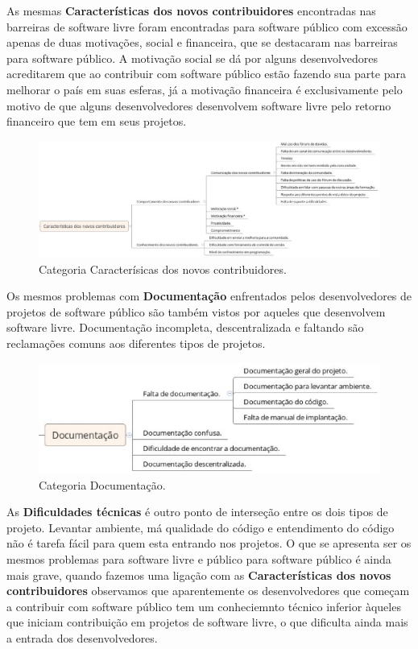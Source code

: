 As mesmas \textbf{Características dos novos contribuidores} encontradas nas barreiras
de software livre foram encontradas para software público com excessão apenas de duas
motivações, social e financeira, que se destacaram nas barreiras para software público.
A motivação social se dá por alguns desenvolvedores acreditarem que ao contribuir com 
software público estão fazendo sua parte para melhorar o país em suas esferas, já
a motivação financeira é exclusivamente pelo motivo de que alguns desenvolvedores
desenvolvem software livre pelo retorno financeiro que tem em seus projetos.

\begin{figure}[h]
	\centering
	\label{fig:caracteristicas}
		\includegraphics[keepaspectratio=true,scale=0.35]{figuras/caracteristicas.eps}
	\caption{Categoria Caracterísicas dos novos contribuidores.}
\end{figure}

Os mesmos problemas com \textbf{Documentação} enfrentados pelos desenvolvedores de 
projetos de software público são também vistos por aqueles que desenvolvem software 
livre. Documentação incompleta, descentralizada e faltando são reclamações comuns aos
diferentes tipos de projetos.

\begin{figure}[h]
	\centering
	\label{fig:documentacao}
		\includegraphics[keepaspectratio=true,scale=0.5]{figuras/documentacao.eps}
	\caption{Categoria Documentação.}
\end{figure}

As \textbf{Dificuldades técnicas} é outro ponto de interseção entre os dois tipos
de projeto. Levantar ambiente, má qualidade do código e entendimento do código
não é tarefa fácil para quem esta entrando nos projetos. O que se apresenta ser
os mesmos problemas para software livre e público para software público é ainda
mais grave, quando fazemos uma ligação com as \textbf{Características dos novos contribuidores}
observamos que aparentemente os desenvolvedores que começam a contribuir com software
público tem um conheciemnto técnico inferior àqueles que iniciam contribuição em 
projetos de software livre, o que dificulta ainda mais a entrada dos desenvolvedores.

